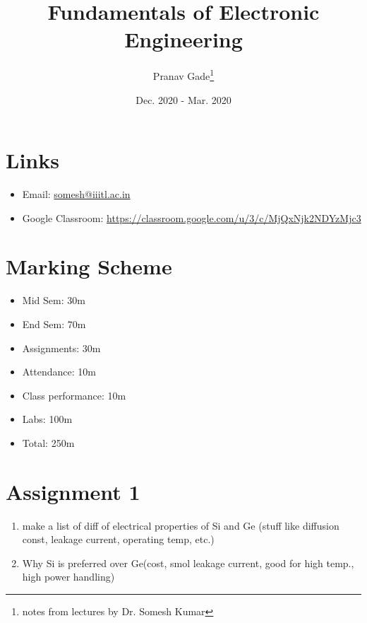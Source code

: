 \documentclass[10pt, a4paper]{report}
\author{Pranav Gade\thanks{notes from lectures by Dr. Somesh Kumar}}
\date{Dec. 2020 - Mar. 2020}
\title{Fundamentals of Electronic Engineering}
\begin{document}
	\maketitle
	\section*{Links}
	\begin{itemize}
		\item Email: \href{somesh@iiitl.ac.in}{somesh@iiitl.ac.in}
		\item Google Classroom: \href{https://classroom.google.com/u/3/c/MjQxNjk2NDYzMjc3}{https://classroom.google.com/u/3/c/MjQxNjk2NDYzMjc3}
	\end{itemize}
	\section*{Marking Scheme}
	\begin{itemize}
		\item Mid Sem: 30m
		\item End Sem: 70m
		\item Assignments: 30m
		\item Attendance: 10m
		\item Class performance: 10m
		\item Labs: 100m
		\item Total: 250m
	\end{itemize}
	\section*{Assignment 1}
	\begin{enumerate}
		\item make a list of diff of electrical properties of Si and Ge (stuff like diffusion const, leakage current, operating temp, etc.)
		\item Why Si is preferred over Ge(cost, smol leakage current, good for high temp., high power handling)
	\end{enumerate}
	\newpage
	
\end{document}
